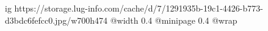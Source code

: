  
 
 
 
 

\ifcmt
  ig https://storage.lug-info.com/cache/d/7/1291935b-19c1-4426-b773-d3bdc6fefcc0.jpg/w700h474
  @width 0.4
  @minipage 0.4
  @wrap \parpic[r]
\fi
